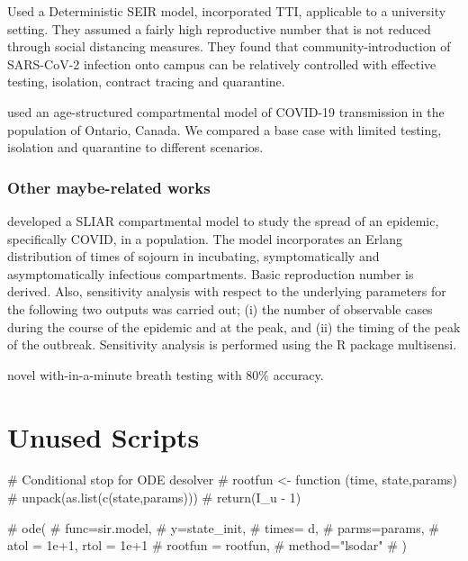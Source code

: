 \documentclass[12pt]{article}
\newcommand{\covid}{COVID-19\xspace}
\DeclareRobustCommand\_{\ifmmode\expandafter\subtxt\else\textunderscore\fi}
\theoremstyle{definition} %
\begin{document}
\citep{lopman2020model} Used a Deterministic SEIR model, incorporated TTI, applicable to a university setting. They assumed a fairly high reproductive number that is not reduced through social
distancing measures. They found that community-introduction of SARS-CoV-2 infection onto campus can be
relatively controlled with effective testing, isolation, contract tracing and quarantine.

\citep{tuite2020mathematical} used an age-structured compartmental model of \covid transmission in the population of Ontario, Canada. We compared a base case with limited testing, isolation and quarantine to different scenarios. 
\subsubsection{Other maybe-related works}
\citep{arino2020simple} developed a SLIAR compartmental model to study the spread of an epidemic, specifically COVID, in a population. The model incorporates an Erlang distribution of times of sojourn in incubating, symptomatically and asymptomatically infectious compartments. Basic reproduction number is derived. Also, sensitivity analysis with respect to the underlying parameters for the following two outputs was carried out; (i) the number of observable cases during the course of the epidemic and at the peak, and (ii) the timing of the peak of the outbreak. Sensitivity analysis is performed using the R package multisensi.

\citep{ruszkiewicz2020diagnosis} novel with-in-a-minute breath testing with 80\% accuracy. 

\section{Unused Scripts}
# Conditional stop for ODE desolver
# rootfun <- function (time, state,params) {
#   unpack(as.list(c(state,params)))
#   return(I_u - 1) }

# ode(
#   func=sir.model,
#   y=state_init,
#   times= d,
#   parms=params,
#   atol = 1e+1, rtol = 1e+1
#   rootfun = rootfun,
#   method="lsodar"
# )
\end{document}
